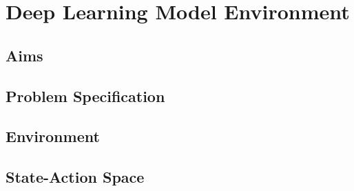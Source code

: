 \chapter{Deep Learning Model Environment}

\section{Aims}

\section{Problem Specification}

\section{Environment}

\section{State-Action Space}